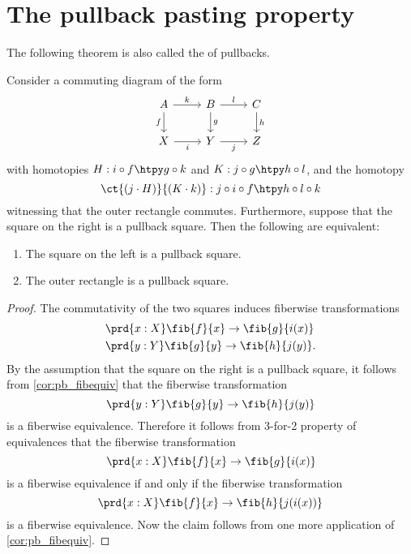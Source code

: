 \section{The pullback pasting property}

The following theorem is also called the  of pullbacks.

\begin{thm}\label{thm:pb_pasting}
Consider a commuting diagram of the form
\begin{equation*}
\begin{tikzcd}
A \arrow[r,"k"] \arrow[d,swap,"f"] & B \arrow[r,"l"] \arrow[d,"g"] & C \arrow[d,"h"] \\
X \arrow[r,swap,"i"] & Y \arrow[r,swap,"j"] & Z
\end{tikzcd}
\end{equation*}
with homotopies $H:i\circ f\htpy g\circ k$ and $K:j\circ g\htpy h\circ l$, and the homotopy
\begin{equation*}
\ct{(j\cdot H)}{(K\cdot k)}:j\circ i\circ f\htpy h\circ l\circ k
\end{equation*}
witnessing that the outer rectangle commutes. Furthermore, suppose that the square on the right is a pullback square. Then the following are equivalent:
\begin{samepage}%
\begin{enumerate}
\item The square on the left is a pullback square.
\item The outer rectangle is a pullback square.
\end{enumerate}%
\end{samepage}%
\end{thm}

\begin{proof}
The commutativity of the two squares induces fiberwise transformations
\begin{align*}
& \prd{x:X}\fib{f}{x}\to \fib{g}{i(x)} \\
& \prd{y:Y}\fib{g}{y}\to \fib{h}{j(y)}.
\end{align*}
By the assumption that the square on the right is a pullback square, it follows from \cref{cor:pb_fibequiv} that the fiberwise transformation
\begin{equation*}
\prd{y:Y}\fib{g}{y}\to\fib{h}{j(y)}
\end{equation*}
is a fiberwise equivalence. Therefore it follows from 3-for-2 property of equivalences that the fiberwise transformation
\begin{equation*}
\prd{x:X}\fib{f}{x}\to\fib{g}{i(x)}
\end{equation*}
is a fiberwise equivalence if and only if the fiberwise transformation
\begin{equation*}
\prd{x:X}\fib{f}{x}\to\fib{h}{j(i(x))}
\end{equation*}
is a fiberwise equivalence. Now the claim follows from one more application of \cref{cor:pb_fibequiv}.
\end{proof}

